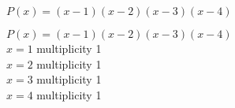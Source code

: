{$P(x) = (x - 1)(x - 2)(x - 3)(x - 4)$
}
{$P(x) = (x - 1)(x - 2)(x - 3)(x - 4)$\\
$x = 1$ multiplicity 1\\
$x = 2$ multiplicity 1\\
$x = 3$ multiplicity 1\\
$x = 4$ multiplicity 1

\begin{center}
\end{center}}